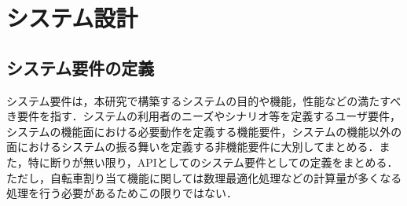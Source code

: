 \section{システム設計}
  \label{sec:システム設計}
    \par
  
  \subsection{システム要件の定義}
    \label{sec:システム要件の定義}
      \par システム要件は，本研究で構築するシステムの目的や機能，性能などの満たすべき要件を指す．システムの利用者のニーズやシナリオ等を定義するユーザ要件，システムの機能面における必要動作を定義する機能要件，システムの機能以外の面におけるシステムの振る舞いを定義する非機能要件に大別してまとめる．また，特に断りが無い限り，APIとしてのシステム要件としての定義をまとめる．ただし，自転車割り当て機能に関しては数理最適化処理などの計算量が多くなる処理を行う必要があるためこの限りではない．

